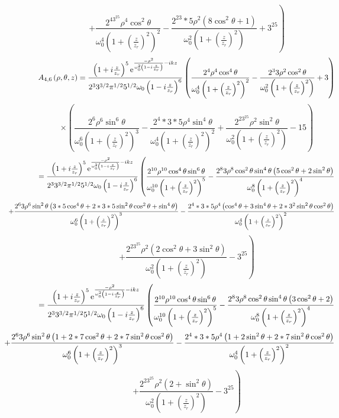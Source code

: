\documentclass[11pt]{amsart}
\makeatletter
\newcommand{\e}{{\rm e}}				%
\newcommand{\msp}[1]{\mspace{#1mu}}		%
\newcommand{\0}{\varnothing}		%
\newcommand{\1}{!}
\newcommand{\2}{@}
\newcommand{\3}{\#}
\newcommand{\4}{\$}
\newcommand{\5}{\%}
\newcommand{\6}{$^\wedge$}
\newcommand{\7}{\&}
\newcommand{\8}{*}
\newcommand{\9}{(}
\makeatother
\begin{document}
\[
\left.+ \frac{2^43^25\rho^4\cos^2\theta}{\omega_0^4\left(1+\left(\frac{z}{z_r}\right)^2\right)^2}-\frac{2^23*5\rho^2\left(8\cos^2\theta+1\right)}{\omega_0^2\left(1+\left(\frac{z}{z_r}\right)^2\right)}+3^25\right)
\]
\[
A_{4,6}\left(\rho,\theta,z\right) = \frac{\left(1+i\frac{z}{z_r}\right)^5\e^{\frac{-\rho^2}{\omega_0^2\left(1-i\frac{z}{z_r}\right)}-ikz}}{2^33^{3/2}\pi^{1/2}5^{1/2}\omega_0\left(1-i\frac{z}{z_r}\right)^6}\left(\frac{2^4\rho^4\cos^4\theta}{\omega_0^4\left(1+\left(\frac{z}{z_r}\right)^2\right)^2}-\frac{2^33\rho^2\cos^2\theta}{\omega_0^2\left(1+\left(\frac{z}{z_r}\right)^2\right)}+3\right)
\]
\[
\times\left(\frac{2^6\rho^6\sin^6\theta}{\omega_0^6\left(1+\left(\frac{z}{z_r}\right)^2\right)^3}-\frac{2^4*3*5\rho^4 \sin^4\theta}{\omega_0^4\left(1+\left(\frac{z}{z_r}\right)^2\right)^2}+\frac{2^23^25\rho^2\sin^2\theta}{\omega_0^2\left(1+\left(\frac{z}{z_r}\right)^2\right)}-15\right)
\]
\[
= \frac{\left(1+i\frac{z}{z_r}\right)^5\e^{\frac{-\rho^2}{\omega_0^2\left(1-i\frac{z}{z_r}\right)}-ikz}}{2^33^{3/2}\pi^{1/2}5^{1/2}\omega_0\left(1-i\frac{z}{z_r}\right)^6}\left(\frac{2^{10}\rho^{10}\cos^4\theta\sin^6\theta}{\omega_0^{10}\left(1+\left(\frac{z}{z_r}\right)^2\right)^5}-\frac{2^83\rho^8\cos^2\theta\sin^4\theta\left(5\cos^2\theta+2\sin^2\theta\right)}{\omega_0^8\left(1+\left(\frac{z}{z_r}\right)^2\right)^4}\right.
\]
\[
\msp{-80}\left.+\frac{2^63\rho^6\sin^2\theta\left(3*5\cos^4\theta+2*3*5\sin^2\theta\cos^2\theta+\sin^4\theta\right)}{\omega_0^6\left(1+\left(\frac{z}{z_r}\right)^2\right)^3}-\frac{2^4*3*5\rho^4\left(\cos^4\theta +3\sin^4\theta +2*3^2\sin^2\theta\cos^2\theta\right)}{\omega_0^4\left(1+\left(\frac{z}{z_r}\right)^2\right)^2}\right.
\]
\[
\left.+\frac{2^23^25\rho^2\left(2\cos^2\theta+3\sin^2\theta\right)}{\omega_0^2\left(1+\left(\frac{z}{z_r}\right)^2\right)}-3^25\right)
\]
\[
= \frac{\left(1+i\frac{z}{z_r}\right)^5\e^{\frac{-\rho^2}{\omega_0^2\left(1-i\frac{z}{z_r}\right)}-ikz}}{2^33^{3/2}\pi^{1/2}5^{1/2}\omega_0\left(1-i\frac{z}{z_r}\right)^6}\left(\frac{2^{10}\rho^{10}\cos^4\theta\sin^6\theta}{\omega_0^{10}\left(1+\left(\frac{z}{z_r}\right)^2\right)^5}-\frac{2^83\rho^8\cos^2\theta\sin^4\theta\left(3\cos^2\theta+2\right)}{\omega_0^8\left(1+\left(\frac{z}{z_r}\right)^2\right)^4}\right.
\]
\[
\msp{-80}\left.+\frac{2^63\rho^6\sin^2\theta\left(1+2*7\cos^2\theta+2*7\sin^2\theta\cos^2\theta\right)}{\omega_0^6\left(1+\left(\frac{z}{z_r}\right)^2\right)^3}-\frac{2^4*3*5\rho^4\left(1+2\sin^2\theta +2*7\sin^2\theta\cos^2\theta\right)}{\omega_0^4\left(1+\left(\frac{z}{z_r}\right)^2\right)^2}\right.
\]
\[
\left.+\frac{2^23^25\rho^2\left(2+\sin^2\theta\right)}{\omega_0^2\left(1+\left(\frac{z}{z_r}\right)^2\right)}-3^25\right)
\]
\end{document}
